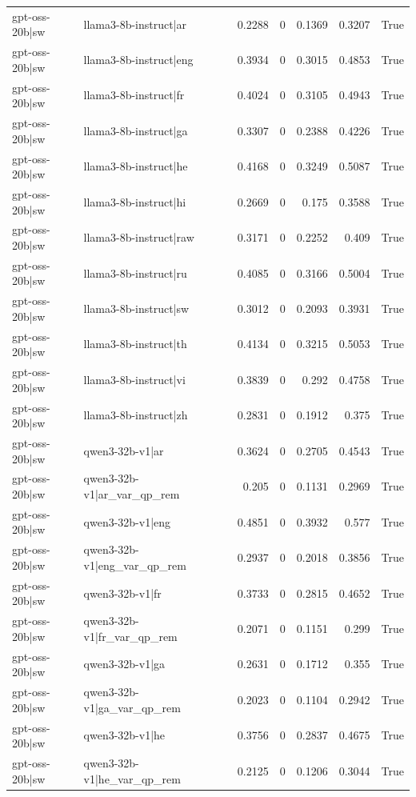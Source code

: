 \begin{table}
\begin{tabular}{l l r r r r l}
gpt-oss-20b|sw & llama3-8b-instruct|ar & 0.2288 & 0 & 0.1369 & 0.3207 & True \\
gpt-oss-20b|sw & llama3-8b-instruct|eng & 0.3934 & 0 & 0.3015 & 0.4853 & True \\
gpt-oss-20b|sw & llama3-8b-instruct|fr & 0.4024 & 0 & 0.3105 & 0.4943 & True \\
gpt-oss-20b|sw & llama3-8b-instruct|ga & 0.3307 & 0 & 0.2388 & 0.4226 & True \\
gpt-oss-20b|sw & llama3-8b-instruct|he & 0.4168 & 0 & 0.3249 & 0.5087 & True \\
gpt-oss-20b|sw & llama3-8b-instruct|hi & 0.2669 & 0 & 0.175 & 0.3588 & True \\
gpt-oss-20b|sw & llama3-8b-instruct|raw & 0.3171 & 0 & 0.2252 & 0.409 & True \\
gpt-oss-20b|sw & llama3-8b-instruct|ru & 0.4085 & 0 & 0.3166 & 0.5004 & True \\
gpt-oss-20b|sw & llama3-8b-instruct|sw & 0.3012 & 0 & 0.2093 & 0.3931 & True \\
gpt-oss-20b|sw & llama3-8b-instruct|th & 0.4134 & 0 & 0.3215 & 0.5053 & True \\
gpt-oss-20b|sw & llama3-8b-instruct|vi & 0.3839 & 0 & 0.292 & 0.4758 & True \\
gpt-oss-20b|sw & llama3-8b-instruct|zh & 0.2831 & 0 & 0.1912 & 0.375 & True \\
gpt-oss-20b|sw & qwen3-32b-v1|ar & 0.3624 & 0 & 0.2705 & 0.4543 & True \\
gpt-oss-20b|sw & qwen3-32b-v1|ar_var_qp_rem & 0.205 & 0 & 0.1131 & 0.2969 & True \\
gpt-oss-20b|sw & qwen3-32b-v1|eng & 0.4851 & 0 & 0.3932 & 0.577 & True \\
gpt-oss-20b|sw & qwen3-32b-v1|eng_var_qp_rem & 0.2937 & 0 & 0.2018 & 0.3856 & True \\
gpt-oss-20b|sw & qwen3-32b-v1|fr & 0.3733 & 0 & 0.2815 & 0.4652 & True \\
gpt-oss-20b|sw & qwen3-32b-v1|fr_var_qp_rem & 0.2071 & 0 & 0.1151 & 0.299 & True \\
gpt-oss-20b|sw & qwen3-32b-v1|ga & 0.2631 & 0 & 0.1712 & 0.355 & True \\
gpt-oss-20b|sw & qwen3-32b-v1|ga_var_qp_rem & 0.2023 & 0 & 0.1104 & 0.2942 & True \\
gpt-oss-20b|sw & qwen3-32b-v1|he & 0.3756 & 0 & 0.2837 & 0.4675 & True \\
gpt-oss-20b|sw & qwen3-32b-v1|he_var_qp_rem & 0.2125 & 0 & 0.1206 & 0.3044 & True \\

\end{tabular}
\end{table}
